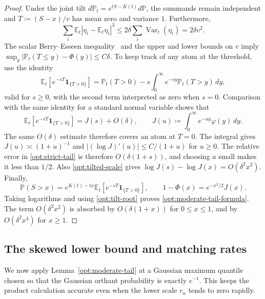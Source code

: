 \documentclass[11pt,letterpaper]{article}
\theoremstyle{remark}
\newcommand{\E}{\mathbb E}
\newcommand{\Pp}{\mathbb P}
\newcommand{\Var}{\operatorname{Var}}
\newcommand{\ind}{\mathbf 1}
\begin{document}
\begin{proof}
Under the joint tilt
\(d\Pp_t=e^{tS-K(t)}d\Pp\), the summands remain independent and
\(T\coloneqq(S-x)/v\) has mean zero and variance \(1\). Furthermore,
\[
 \sum_i\E_t|\eta_i-\E_t\eta_i|^3
 \le2\delta\sum_i\Var_t(\eta_i)=2\delta v^2.
\]
The scalar Berry--Esseen inequality~\cite{Berry1941} and the upper and lower bounds on \(v\) imply
\(\sup_y|\Pp_t(T\le y)-\Phi(y)|\le C\delta\).
To keep track of any atom at the threshold, use the identity
\[
 \E_t[e^{-sT}\ind_{\{T>0\}}]
 =\Pp_t(T>0)-s\int_0^\infty e^{-sy}\Pp_t(T>y)\,dy,
\]
valid for \(s\ge0\), with the second term interpreted as zero when
\(s=0\). Comparison with
the same identity for a standard normal variable shows that
\begin{equation}
 \E_t[e^{-sT}\ind_{\{T>0\}}]=J(s)+O(\delta),\qquad
 J(u)\coloneqq\int_0^\infty e^{-uy}\varphi(y)\,dy.
 \label{opt:strict-tail}
\end{equation}
The same \(O(\delta)\) estimate therefore covers an atom at \(T=0\).
The integral gives \(J(u)\asymp(1+u)^{-1}\) and
\(|(\log J)'(u)|\le C/(1+u)\) for \(u\ge0\).
The relative error in \eqref{opt:strict-tail} is therefore
\(O(\delta(1+s))\), and choosing \(a\) small makes it less than \(1/2\).
Also \eqref{opt:tilted-scale} gives
\(\log J(s)-\log J(x)=O(\delta^2x^2)\).
Finally,
\[
 \Pp(S>x)=e^{K(t)-tx}\E_t[e^{-sT}\ind_{\{T>0\}}],\qquad
 1-\Phi(x)=e^{-x^2/2}J(x).
\]
Taking logarithms and using \eqref{opt:tilt-root} proves
\eqref{opt:moderate-tail-formula}. The term \(O(\delta^2x^2)\) is
absorbed by \(O(\delta(1+x))\) for \(0\le x\le1\), and by
\(O(\delta^2x^4)\) for \(x\ge1\).
\end{proof}


\subsection{The skewed lower bound and matching rates}
\label{app:skew-proof}
We now apply Lemma~\ref{opt:moderate-tail} at a Gaussian maximum
quantile chosen so that the Gaussian orthant probability is exactly
\(e^{-1}\). This keeps the product calculation accurate even when
the lower scale \(r_n\) tends to zero rapidly.
\end{document}
